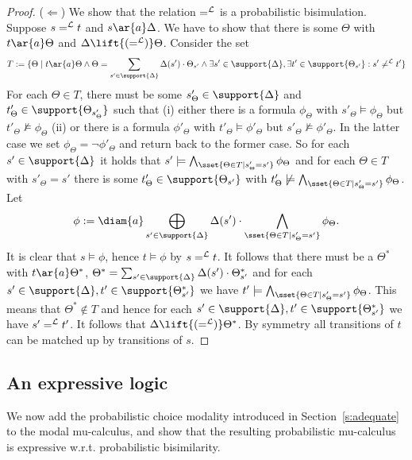 \documentclass{article}
\def \CL{{\cal L}}
\begin{document}
\begin{proof}
($\Leftarrow$) We show that the relation $=^\CL$ is a probabilistic
bisimulation. Suppose $s =^\CL t$ and $s\ar{a}\Delta$. We have to
show that there is some $\Theta$ with $t\ar{a}\Theta$ and $\Delta
\lift{(=^\CL)} \Theta$. Consider the set
\[T:=\{\Theta \mid t\ar{a}\Theta \wedge \Theta=\sum_{s'\in\support{\Delta}}\Delta(s')\cdot \Theta
_{s'}\wedge \exists s'\in\support{\Delta},\exists
t'\in\support{\Theta_{s'}}: s'\not=^\CL t'\}\]
 For each $\Theta\in T$, there must be some
 $s'_\Theta\in\support{\Delta}$ and
 $t'_\Theta\in\support{\Theta_{s'_\Theta}}$ such that (i) either there is a formula $\phi_{\Theta}$ with
$s'_\Theta\models\phi_{\Theta}$ but
$t'_\Theta\not\models\phi_{\Theta}$ (ii) or there is a formula
$\phi'_{\Theta}$ with $t'_\Theta\models\phi'_{\Theta}$ but
$s'_\Theta\not\models\phi'_{\Theta}$. In the latter case we set
$\phi_{\Theta}=\neg\phi'_{\Theta}$ and return back to the former
case. So for each $s'\in\support{\Delta}$ it holds that
$s'\models\bigwedge_{\sset{\Theta\in T\mid s'_\Theta =
s'}}\phi_\Theta$ and for each $\Theta\in T$ with $s'_\Theta=s'$
there is some $t'_{\Theta}\in\support{\Theta_{s'}}$ with
$t'_{\Theta}\not\models \bigwedge_{\sset{\Theta\in T\mid s'_\Theta =
s'}}\phi_\Theta$. Let
\[\phi:=\diam{a}\bigoplus_{s'\in\support{\Delta}}\Delta(s')\cdot\bigwedge_{\sset{\Theta\in T\mid s'_{\Theta}=s'}}\phi_{\Theta}.\]
It is clear that $s\models\phi$, hence $t\models\phi$ by $s=^\CL t$.
It follows that there must be a $\Theta^\ast$ with
$t\ar{a}\Theta^\ast$,
$\Theta^\ast=\sum_{s'\in\support{\Delta}}\Delta(s')\cdot\Theta^\ast_{s'}$
and for each $s'\in\support{\Delta},
t'\in\support{\Theta^\ast_{s'}}$ we have
$t'\models\bigwedge_{\sset{\Theta\in T\mid s'_\Theta =
s'}}\phi_\Theta$. This means that $\Theta^\ast\not\in T$ and hence
for each $s'\in\support{\Delta}, t'\in\support{\Theta^\ast_{s'}}$ we
have $s'=^\CL t'$. It follows that $\Delta\lift{(=^\CL)}
\Theta^\ast$. By symmetry all transitions of $t$ can be matched up
by transitions of $s$.
\end{proof}

\subsection{An expressive logic}
We now add the probabilistic choice modality introduced in
Section~\ref{s:adequate} to the modal mu-calculus, and show that the
resulting probabilistic mu-calculus is expressive w.r.t.
probabilistic bisimilarity.
\end{document}

